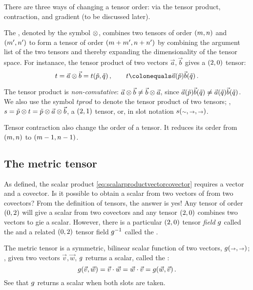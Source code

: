 There are three ways of changing a tensor order: via the tensor product, contraction, and gradient (to be discussed later).

The , denoted by the symbol $\otimes$, combines two tensors of order $\torder mn$ and $\torder{m'}{n'}$ to form a tensor of order $\torder{m + m'}{n + n'}$ by combining the argument list of the two tensors and thereby expanding the dimensionality of the tensor space. For instanace, the tensor product of two vectors $\vec a,\vec b$ gives a $\torder 20$ tensor:
%
\begin{equation*}
  t = \vec a\tprod\vec b
    = t\vat{\cov p,\cov q}\,,\qquad
  t \defas \vec a\vat{\cov p}\vec b\vat{\cov q}\,.
\end{equation*}

The tensor product is \emph{non-comutative}: $\vec a\otimes\vec b\neq\vec b\otimes\vec a$, since $\vec a\vat{\cov p}\vec b\vat{\cov q}\neq\vec a\vat{\cov q}\vec b\vat{\cov q}$. We also use the symbol $tprod$ to denote the tensor product of two tensors; \eg, $s =\tilde{p}\otimes t = \tilde{p}\otimes\vec a\otimes\vec b$, a $\torder 21$ tensor, or, in slot notation $s\vat{\cslot,\vslot,\vslot}$.

Tensor contraction also change the order of a tensor. It reduces its order from $\torder mn$ to $\torder{m - 1}{n - 1}$.


\subsection{The metric tensor}
%
As defined, the scalar product \cref{eq:scalarproductvectorcovector} requires a vector and a covector. Is it possible to obtain a scalar from two vectors of from two covectors? From the definition of tensors, the answer is yes! Any tensor of order $\torder 02$ will give a scalar from two covectors and any tensor $\torder 20$ combines two vectors to gie a scalar. However, there is a particular $\torder 20$ tensor \emph{field} $g$ called the  and a related $\torder 02$ tensor field $g^{-1}$ called the .

The metric tensor is a symmetric, bilinear scalar function of two vectors, $\metric\vat{\vslot,\vslot}$; \ie, given two vectors $\vec v,\vec w$, $g$ returns a scalar, called the :
%
\begin{equation}\label{eq:vectordotproduct}
  \metric\vat{\vec v,\vec w} = \vec v\iprod\vec w 
                             = \vec w\iprod\vec v
                             = \metric\vat{\vec w, \vec v}\,.
\end{equation}
%
See that $g$ returns a scalar when both slots are taken.

